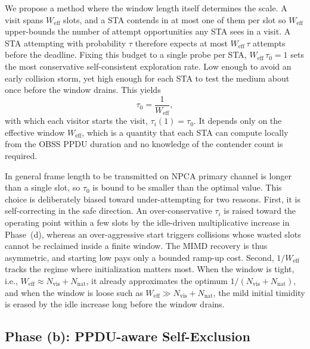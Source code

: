 \documentclass[conference]{IEEEtran}
\newcommand{\Nvis}{N_\mathrm{vis}}
\newcommand{\Nnat}{N_\mathrm{nat}}
\begin{document}
We propose a method where the window length itself determines the scale. A visit spans $W_\mathrm{eff}$ slots, and a STA contends in at most one of them per slot so $W_\mathrm{eff}$ upper-bounds the number of attempt opportunities any STA sees in a visit. A STA attempting with probability $\tau$ therefore expects at most $W_\mathrm{eff}\,\tau$ attempts before the deadline. Fixing this budget to a single probe per STA, $W_\mathrm{eff}\,\tau_0 = 1$ sets the most conservative self-consistent  exploration rate. Low enough to avoid an early collision storm, yet high enough for each STA to test the medium about once before the window drains. This yields
\begin{equation}
    \tau_0 = \frac{1}{W_\mathrm{eff}},
    \label{eq:init}
\end{equation}
with which each visitor starts the visit, $\tau_i(1)=\tau_0$. It depends only on the effective window $W_\mathrm{eff}$, which is a quantity that each STA can compute locally from the OBSS PPDU duration and no knowledge of the contender count is required.

In general frame length to be transmitted on NPCA primary channel is longer than a single slot, so $\tau_0 $ is bound to be smaller than the optimal value. This choice is deliberately biased toward under-attempting for two reasons. First, it is self-correcting in the safe direction. An over-conservative $\tau_i$ is raised toward the operating point within a few slots by the idle-driven multiplicative increase in Phase~(d), whereas an over-aggressive start triggers collisions whose wasted slots cannot be reclaimed inside a finite window. The MIMD recovery is thus asymmetric, and starting low pays only a bounded ramp-up cost. Second, $1/W_\mathrm{eff}$ tracks the regime where initialization matters most. When the window is tight, i.e., $W_\mathrm{eff}\!\approx\!\Nvis{+}\Nnat$, it already approximates the optimum $1/(\Nvis{+}\Nnat)$, and when the window is loose such as $W_\mathrm{eff}\!\gg\!\Nvis{+}\Nnat$, the mild initial timidity is erased by the idle increase long before the window drains. 

\subsection{Phase (b): PPDU-aware Self-Exclusion}
\label{subsec:self_exclusion}
\end{document}
